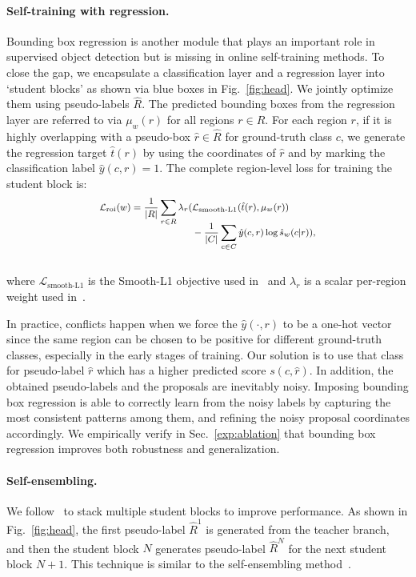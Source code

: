 \documentclass[10pt,twocolumn,letterpaper]{article}
\begin{document}
\paragraph{Self-training with regression.} 
Bounding box regression is another module that plays an important role in supervised object detection but is missing in online self-training methods. To close the gap, we encapsulate a classification layer and a regression layer into `student blocks' as shown via blue boxes in Fig.~\ref{fig:head}.  We jointly optimize them using pseudo-labels $\hat R$. The predicted bounding boxes from the regression layer are referred to via $\mu_w(r)$ for all regions $ r \in R$. For each region $r$, if it is highly overlapping with a pseudo-box $\hat r \in \hat R$ for ground-truth class $c$, we  generate the regression target $\hat t(r)$ by using the coordinates of $\hat r$ and by marking the classification label $\hat y(c,r)=1$. The complete region-level loss for training the student block is:
\begin{align}
\footnotesize
\begin{split}
\mathcal{L}_\text{roi}(w) = \frac{1}{|R|}  \sum_{r\in R}  \lambda_r ( &
 \mathcal{L}_{\text{smooth-L1}} (\hat{t}(r), \mu_w(r))  \\[-6pt]
& -\frac{1}{|C|} \sum_{c \in C} \hat{y}(c,r) \log {\hat s_w(c|r)} ),
\label{eq:new_roi}
\end{split}
\end{align} \\[-10pt]
where $\mathcal{L}_{\text{smooth-L1}}$ is the Smooth-L1 objective  used in~\cite{fastrcnn} and $\lambda_r$ is a scalar per-region weight  used in~\cite{tang2017multiple}. 

In practice, conflicts happen when we force the $\hat{y}(\cdot,r)$ to be a one-hot vector since the same region can be chosen to be positive for different ground-truth classes, especially in the early stages of training. Our solution is to use that class for pseudo-label $\hat r$ which has a higher predicted score $s(c, \hat r)$. In addition, the obtained pseudo-labels and the proposals are inevitably  noisy. Imposing bounding box regression is able to correctly learn from the noisy labels by capturing the most consistent patterns among them, and refining the noisy proposal coordinates accordingly. We empirically verify in Sec.~\ref{exp:ablation} that bounding box regression improves both robustness and generalization. 

\vspace{-0.5em}
\paragraph{Self-ensembling.}
We follow~\cite{tang2017multiple, tang2018pcl} to stack multiple student blocks to improve  performance. As shown in Fig.~\ref{fig:head}, the first pseudo-label $\hat R^1$ is generated from the teacher branch, and then the student block $N$  generates  pseudo-label $\hat R^N$ for the next student block $N+1$. This technique is similar to the self-ensembling method~\cite{Laine2017}. 
\end{document}
